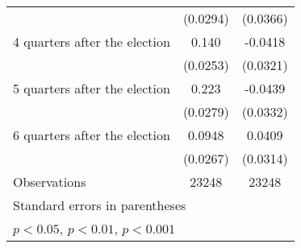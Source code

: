 \begin{table}[htbp]
\begin{tabular}{l*{2}{c}}
                    &    (0.0294)         &    (0.0366)         \\
[1em]
 4 quarters after the election&       0.140\sym{***}&     -0.0418         \\
                    &    (0.0253)         &    (0.0321)         \\
[1em]
 5 quarters after the election&       0.223\sym{***}&     -0.0439         \\
                    &    (0.0279)         &    (0.0332)         \\
[1em]
 6 quarters after the election&      0.0948\sym{***}&      0.0409         \\
                    &    (0.0267)         &    (0.0314)         \\
\hline
Observations        &       23248         &       23248         \\
\hline\hline
\multicolumn{3}{l}{\footnotesize Standard errors in parentheses}\\
\multicolumn{3}{l}{\footnotesize \sym{*} \(p<0.05\), \sym{**} \(p<0.01\), \sym{***} \(p<0.001\)}\\
\end{tabular}
\end{table}
